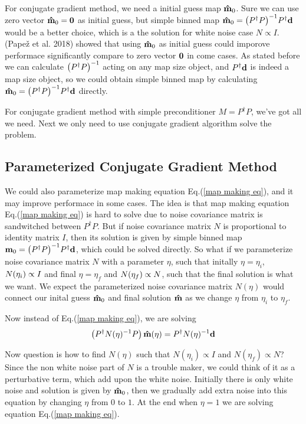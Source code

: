 \documentclass[11pt, letterpaper]{article}
\newcommand{\vbd}{\vb{d}}
\newcommand{\vbm}{\vb{m}}
\newcommand{\inv}[1]{#1^{-1}}
\newcommand{\hatm}{\vb{\hat{m}}}
\newcommand{\Pdagger}{P^{\dagger}}
\newcommand{\PPinv}[1]{\inv{\qty(\Pdagger #1 P)}}
\begin{document}
For conjugate gradient method, we need a initial guess map $\hatm_0$. 
Sure we can use zero vector $\hatm_0 = \vb{0}$ as initial guess,
but simple binned map $\hatm_0 = \PPinv{} \Pdagger \vbd$ would be a better 
choice, which is a the solution for white noise case $N \propto I$.
(Pape\v{z} et al. 2018\cite{2018A&A...620A..59P}) showed that using 
$\hatm_0$ as initial guess could imporove performace significantly compare to
zero vector $\vb{0}$ in come cases.
As stated before we can calculate $\PPinv{}$ acting on any map size object,
and $\Pdagger \vbd$ is indeed a map size object, 
so we could obtain simple binned map by calculating
$\hatm_0 = \PPinv{} \Pdagger \vbd$ directly.

For conjugate gradient method with simple preconditioner $M = \Pdagger P$,
we've got all we need.
Next we only need to use conjugate gradient algorithm solve the problem.

\subsection{Parameterized Conjugate Gradient Method}

We could also parameterize map making equation Eq.(\ref{map making eq}),
and it may improve performace in some cases.
The idea is that map making equation Eq.(\ref{map making eq}) is hard to solve
due to noise covariance matrix is sandwitched between $\Pdagger P$.
But if noise covariance matrix $N$ is proportional to identity matrix $I$, 
then its solution is given by simple binned map
$\vbm_0 = \inv{\qty(\Pdagger P)} \Pdagger \vbd$,
which could be solved directly. 
So what if we parameterize noise covariance matrix $N$ with a parameter $\eta$,
such that initally $\eta = \eta_i$, $N\qty(\eta_i) \propto I$ 
and final $\eta = \eta_f$ and $N\qty(\eta_f) \propto N$,
such that the final solution is what we want.
We expect the parameterized noise covariance matrix $N(\eta)$
would connect our inital guess $\hatm_0$ and final solution $\hatm$ as we 
change $\eta$ from $\eta_i$ to $\eta_f$.

Now instead of Eq.(\ref{map making eq}), we are solving
\begin{align}
\qty(\Pdagger \inv{N(\eta)} P)\, \hatm(\eta) 
= \Pdagger \inv{N(\eta)} \vbd \label{map making para}
\end{align}

Now question is how to find $N(\eta)$ such that $N(\eta_i) \propto I$
and $N (\eta_f) \propto N$?
Since the non white noise part of $N$ is a trouble maker,
we could think of it as a perturbative term, which add upon the white noise.
Initially there is only white noise and solution is given by $\hatm_0$,
then we gradually add extra noise into this equation by changing $\eta$ from 
$0$ to $1$.
At the end when $\eta=1$ we are solving equation Eq.(\ref{map making eq}).
\end{document}

